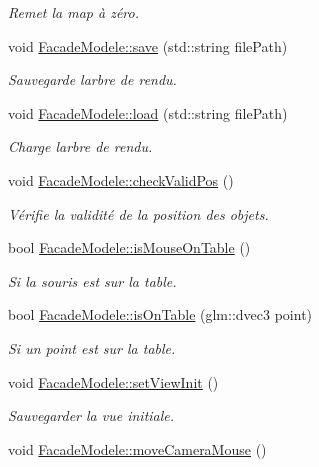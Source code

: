 \begin{DoxyCompactItemize}
\begin{DoxyCompactList}\small\item\em Remet la map à zéro. \end{DoxyCompactList}\item 
void \hyperlink{group__inf2990_ga32032b986fdb830fb158dbd354aa55e7}{Facade\+Modele\+::save} (std\+::string file\+Path)
\begin{DoxyCompactList}\small\item\em Sauvegarde l\textquotesingle{}arbre de rendu. \end{DoxyCompactList}\item 
void \hyperlink{group__inf2990_ga4a34752db2d5c26cf97baca584c27dec}{Facade\+Modele\+::load} (std\+::string file\+Path)
\begin{DoxyCompactList}\small\item\em Charge l\textquotesingle{}arbre de rendu. \end{DoxyCompactList}\item 
void \hyperlink{group__inf2990_ga612cbe4c05f2e8adfb632db4fb1a3cf0}{Facade\+Modele\+::check\+Valid\+Pos} ()
\begin{DoxyCompactList}\small\item\em Vérifie la validité de la position des objets. \end{DoxyCompactList}\item 
bool \hyperlink{group__inf2990_gaaaa7ff115548c42faa0570a3c7c4648e}{Facade\+Modele\+::is\+Mouse\+On\+Table} ()
\begin{DoxyCompactList}\small\item\em Si la souris est sur la table. \end{DoxyCompactList}\item 
bool \hyperlink{group__inf2990_ga58f9c6d2f80118bcdf95e1967a455bea}{Facade\+Modele\+::is\+On\+Table} (glm\+::dvec3 point)
\begin{DoxyCompactList}\small\item\em Si un point est sur la table. \end{DoxyCompactList}\item 
void \hyperlink{group__inf2990_gab3bc1f3520b17ed3d19287f3d411dd82}{Facade\+Modele\+::set\+View\+Init} ()
\begin{DoxyCompactList}\small\item\em Sauvegarder la vue initiale. \end{DoxyCompactList}\item 
void \hyperlink{group__inf2990_gaba7107809948a77f8ef3bf2240bc2bc4}{Facade\+Modele\+::move\+Camera\+Mouse} ()

\end{DoxyCompactItemize}
